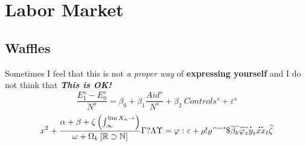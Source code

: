 \documentclass{article}
\begin{document}
\displayoptions

\section{Labor Market}

\subsection{Waffles}
\label{sub:waffles}

Sometimes I feel that this is not \textit{a proper way} of \textbf{expressing yourself} and I do not think that \textbf{\textit{This is OK!}}
\begin{equation}
  \dfrac{E_1^s - E_0^s}{N^s}
  = \beta_0 + \beta_1 \dfrac{Aid^s}{N^s} + \beta_2 ~ Controls^s + \varepsilon^s
\end{equation}
\[
  x^2 + \dfrac{\alpha + \beta + \zeta \left(\int_{\infty}^{\lim X_n \to \empty}\right)}{\omega + \Omega_k \left[\mathbb{R} \supset \mathbb{N}\right]}
  \Gamma ? \Lambda\Upsilon = \varphi : \varepsilon + \rho ! \varrho
\acute ~ \grave ~ \breve ~ \check ~ \mathring ~ \mathdollar
\overline{\beta_k} \widetilde{\varphi_z} \dot{y}_t \ddot{xx}_t \widehat{\zeta}
\]


\end{document}
